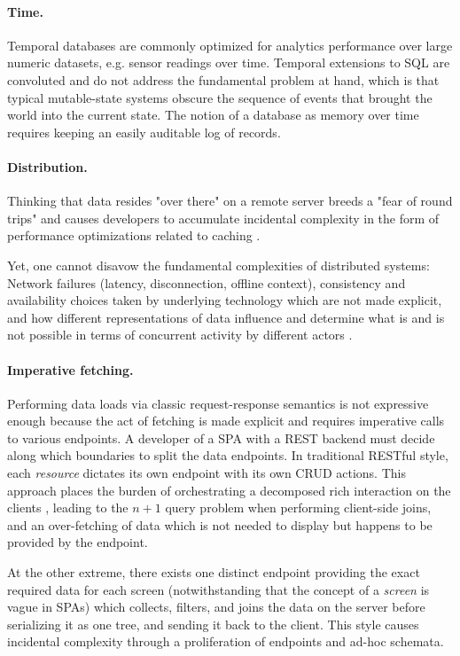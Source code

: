 \paragraph{Time.}
Temporal databases are commonly optimized for analytics performance over large numeric datasets, e.g. sensor readings over time. Temporal extensions to SQL \cite{kulkarni2012temporal} are convoluted and do not address the fundamental problem at hand, which is that typical mutable-state systems obscure the sequence of events that brought the world into the current state. The notion of a database as memory over time requires keeping an easily auditable log of records.

\paragraph{Distribution.}
Thinking that data resides "over there" on a remote server breeds a "fear of round trips" and causes developers to accumulate incidental complexity in the form of performance optimizations related to caching \cite{hickey2012dbvalue}.

Yet, one cannot disavow the fundamental complexities of distributed systems: Network failures (latency, disconnection, offline context), consistency and availability choices taken by underlying technology which are not made explicit, and how different representations of data influence and determine what is and is not possible in terms of concurrent activity by different actors \cite{emerick2014api}.

\paragraph{Imperative fetching.}
Performing data loads via classic request-response semantics is not expressive enough because the act of fetching is made explicit and requires imperative calls to various endpoints. A developer of a \gls{SPA} with a \gls{REST} backend must decide along which boundaries to split the data endpoints. In traditional RESTful style, each \emph{resource} dictates its own endpoint with its own \gls{CRUD} actions. This approach places the burden of orchestrating a decomposed rich interaction on the clients \cite{calderwood15cqrs}, leading to the $n+1$ query problem when performing client-side joins, and an over-fetching of data which is not needed to display but happens to be provided by the endpoint.

At the other extreme, there exists one distinct endpoint providing the exact required data for each screen (notwithstanding that the concept of a \emph{screen} is vague in SPAs) which collects, filters, and joins the data on the server before serializing it as one tree, and sending it back to the client. This style causes incidental complexity through a proliferation of endpoints and ad-hoc schemata.

